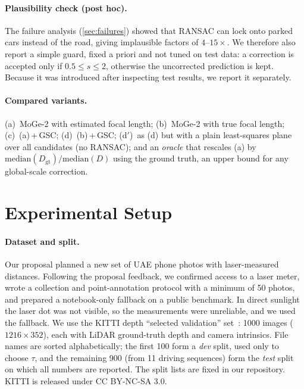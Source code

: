 \documentclass[10pt,twocolumn,letterpaper]{article}
\begin{document}
\paragraph{Plausibility check (post hoc).}
The failure analysis (\cref{sec:failures}) showed that RANSAC can lock onto parked cars instead of
the road, giving implausible factors of $4$--$15\times$. We therefore also report a simple guard, fixed
a priori and not tuned on test data: a correction is accepted only if $0.5 \le s \le 2$, otherwise the
uncorrected prediction is kept. Because it was introduced after inspecting test results, we report it
separately.

\paragraph{Compared variants.}
(a)~MoGe-2 with estimated focal length; (b)~MoGe-2 with true focal length; (c)~(a)\,+\,GSC;
(d)~(b)\,+\,GSC; (d$'$)~as (d) but with a plain least-squares plane over all candidates (no RANSAC);
and an \emph{oracle} that rescales (a) by $\mathrm{median}(D_{\text{gt}})/\mathrm{median}(D)$ using the
ground truth, an upper bound for any global-scale correction.

\section{Experimental Setup}
\label{sec:setup}

\paragraph{Dataset and split.}
Our proposal planned a new set of UAE phone photos with laser-measured distances. Following the
proposal feedback, we confirmed access to a laser meter, wrote a collection and point-annotation
protocol with a minimum of 50 photos, and prepared a notebook-only fallback on a public benchmark.
In direct sunlight the laser dot was not visible, so the measurements were unreliable, and we used
the fallback.
We use the KITTI depth ``selected validation'' set~\cite{geiger2012kitti,uhrig2017sparsity}: 1000
images ($1216\times352$), each with LiDAR ground-truth depth and camera
intrinsics. File names are sorted alphabetically; the first 100 form a \emph{dev} split, used only to
choose $\tau$, and the remaining 900 (from 11 driving sequences) form the \emph{test} split on which all numbers are
reported.
The split lists are fixed in our repository. KITTI is released under CC BY-NC-SA 3.0.
\end{document}

